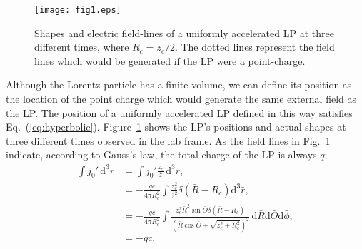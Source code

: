 \documentclass[a4paper,fleqn]{cas-sc}
\begin{document}
\begin{figure}%
\centering
\texttt{[image: fig1.eps]}
\caption{Shapes and electric field-lines of a uniformly accelerated LP at three different times, where $R_{c} = z_{c}/2$. The dotted lines represent the field lines which would be generated if the LP were a point-charge.} \label{fig:LP}
\end{figure}

Although the Lorentz particle has a finite volume, we can define its position as the location of the point charge which would generate the same external field as the LP. The position of a uniformly accelerated LP defined in this way satisfies Eq.~(\ref{eq:hyperbolic}). Figure~\ref{fig:LP} shows the LP's positions and actual shapes at three different times observed in the lab frame. As the field lines in Fig.~\ref{fig:LP} indicate, according to Gauss's law, the total charge of the LP is always $q$;
\begin{align}
\int j_{0}' \,\mathrm{d}^{3}r &= \int \bar{j}_{0}' \displaystyle\frac{z_{c}}{\bar{z}} \,\mathrm{d}^{3}\bar{r} , \nonumber \\
&= -\displaystyle\frac{qc}{4\pi R_{c}^{2}} \int \displaystyle\frac{z_{c}^{2}}{\bar{z}^{2}} \delta\left(\bar{R}-R_{c}\right) \mathrm{d}^{3}\bar{r} , \nonumber \\
&= -\displaystyle\frac{qc}{4\pi R_{c}^{2}} \int \displaystyle\frac{z_{c}^{2}\bar{R}^{2}\sin\bar{\Theta} \delta\left(\bar{R}-R_{c}\right)}{\left(\bar{R}\cos\bar{\Theta} + \sqrt{z_{c}^{2}+R_{c}^{2}}\right)^{2}} \,\mathrm{d}\bar{R}\mathrm{d}\bar{\Theta}\mathrm{d}\bar{\phi} , \nonumber \\
&= -qc . \label{eq:charge}
\end{align}

\end{document}
